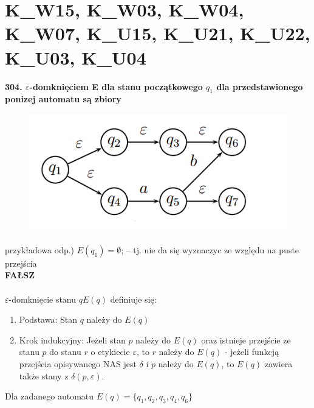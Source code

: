 \section{K\_W15, K\_W03, K\_W04, K\_W07, K\_U15, K\_U21, K\_U22, K\_U03, K\_U04}
\textbf{304. $\varepsilon$-domknięciem E dla stanu początkowego $q_1$ dla przedstawionego ponizej automatu są zbiory}

\begin{figure}[h!]
\includegraphics[scale=0.5]{automata.png}
\end{figure}

przykładowa odp.) $E(q_1) = \emptyset$; – tj. nie da się wyznaczyc ze względu na puste przejścia\\
\textbf{FAŁSZ}\\\\

$\varepsilon$-domknięcie stanu $q E(q)$ definiuje się:
\begin{enumerate}
\item Podstawa: Stan $q$ należy do $E(q)$
\item Krok indukcyjny: Jeżeli stan $p$ należy do $E(q)$ oraz istnieje przejście ze stanu $p$ do stanu $r$ o etykiecie $\varepsilon$, to $r$ należy do $E(q)$ - jeżeli funkcją przejścia opisywanego NAS jest $\delta$ i $p$ należy do $E(q)$, to $E(q)$ zawiera także stany z $\delta(p, \varepsilon)$.
\end{enumerate}

Dla zadanego automatu $E(q) = \{q_1, q_2, q_3, q_4, q_6\}$
